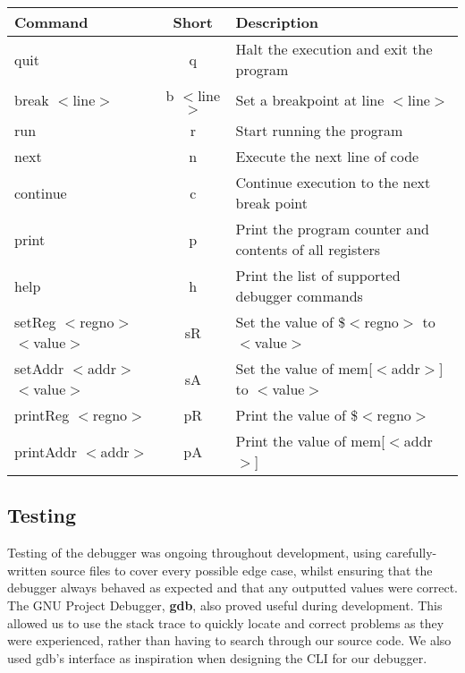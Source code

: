 \documentclass[11pt]{report}
\begin{document}
\begin{adjustwidth}{-.5in}{-.5in} 
	\begin{center} 
	\begin{tabular}{ | l | c | p{5cm} |}
	\hline
	Command & Short & Description \\ \hline
	quit & q & Halt the execution and exit the program \\ \hline
	break $<$line$>$ & b $<$line$>$ & Set a breakpoint at line $<$line$>$ \\ \hline
	run & r & Start running the program \\ \hline
	next & n & Execute the next line of code \\ \hline
	continue & c & Continue execution to the next break point \\ \hline
	print & p & Print the program counter and contents of all registers \\ \hline
	help & h & Print the list of supported debugger commands \\ \hline
	setReg $<$regno$>$ $<$value$>$ & sR & Set the value of \$$<$regno$>$ to $<$value$>$ \\ \hline
	setAddr $<$addr$>$ $<$value$>$ & sA & Set the value of mem[$<$addr$>$] to $<$value$>$ \\ \hline
	printReg $<$regno$>$ & pR & Print the value of \$$<$regno$>$ \\ \hline
	printAddr $<$addr$>$ & pA & Print the value of mem[$<$addr$>$] \\ \hline
	\end{tabular}
	\end{center}
\end{adjustwidth}

\subsection*{Testing}

Testing of the debugger was ongoing throughout development, using carefully-written
source files to cover every possible edge case, whilst ensuring that the debugger
always behaved as expected and that any outputted values were correct. The GNU
Project Debugger, \textbf{gdb}, also proved useful during development. This allowed
us to use the stack trace to quickly locate and correct problems as they were
experienced, rather than having to search through our source code. We also used
gdb's interface as inspiration when designing the CLI for our debugger.

\newpage
\end{document}
